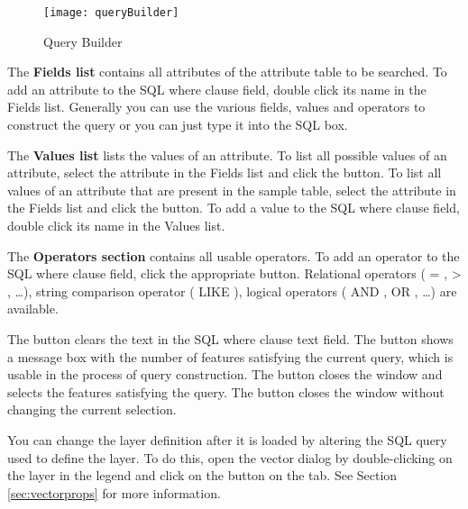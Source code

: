 \begin{figure}[ht]
  \centering
    \texttt{[image: queryBuilder]}
    \caption{Query Builder \nixcaption}\label{fig:query_builder}
\end{figure}

The \textbf{Fields list} contains all attributes of the attribute table to be
searched. To add an attribute to the SQL where clause field, double click its
name in the Fields list. Generally you can use the various fields, values and
operators to construct the query or you can just type it into the SQL box.

The \textbf{Values list} lists the values of an attribute. To list all possible
values of an attribute, select the attribute in the Fields list and click the
 button. To list all values
of an attribute that are present in the sample table, select the attribute in
the Fields list and click the 
button. To add a value to the SQL
where clause field, double click its name in the Values list.

The \textbf{Operators section} contains all usable operators. To add an operator
to the SQL where clause field, click the appropriate button. Relational operators
( = , > , \dots), string comparison operator ( LIKE ), logical operators ( AND , OR
, \dots) are available.

The  button clears the text in the SQL where clause text field. The
 button shows a message box with the number of features satisfying
the current query, which is usable in the process of query construction. The
 button closes the window and selects the features satisfying the
query. The  button closes the window without changing the current
selection.

\begin{Tip}\caption{\textsc{Changing the Layer Definition}}
You can change the layer definition after it is loaded by altering
the SQL query used to define the layer. To do this, open the
vector  dialog by double-clicking on the layer in the legend and click on the
 button on the  tab. See Section
\ref{sec:vectorprops} for more information.
\end{Tip}

\label{sec:select_by_query}

